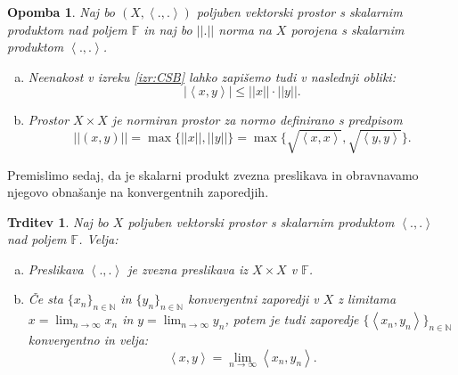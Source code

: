 \documentclass[12pt,a4paper,oneside,fleqn,openany]{book}
\newtheorem{trditev}[izrek]{Trditev}
\newtheorem{opomba}[izrek]{Opomba}
\newcommand{\F}{\mathbb{F}}
\newcommand{\N}{\mathbb{N}}
\newcommand{\abs}[1]{\ensuremath{\lvert #1 \rvert}}
\newcommand{\norm}[1]{\abs{\abs{#1}}}
\newcommand{\Sp}[2]{\ensuremath{\left<#1, #2\right>}}
\begin{document}
\begin{opomba}
	\label{opomb:CSB}
	Naj bo $(X, \Sp{.}{.})$ poljuben vektorski prostor s skalarnim produktom nad poljem $\F$ in naj bo $\norm{.}$ norma na $X$ porojena s skalarnim produktom $\Sp{.}{.}$.
	\begin{enumerate}[a)]
		\item Neenakost v izreku \ref{izr:CSB} lahko zapišemo tudi v naslednji obliki: $$\abs{\Sp{x}{y}} \leq \norm{x}\cdot\norm{y}.$$
		\item Prostor $X\times X$ je normiran prostor za normo definirano s predpisom $$\norm{(x, y)}=\max\{\norm{x}, \norm{y}\}=\max\{\sqrt{\Sp{x}{x}}, \sqrt{\Sp{y}{y}}\}.$$
	\end{enumerate}	
\end{opomba}
Premislimo sedaj, da je skalarni produkt zvezna preslikava in obravnavamo njegovo obnašanje na konvergentnih zaporedjih.
\begin{trditev}
	\label{trd:spzvez}
	Naj bo $X$ poljuben vektorski prostor s skalarnim produktom $\Sp{.}{.}$ nad poljem $\F$. Velja: \begin{enumerate}[a)]
		\item Preslikava $\Sp{.}{.}$ je zvezna preslikava iz $X\times X$ v $\F$.
		\item Če sta $\{x_n\}_{n\in\N}$ in $\{y_n\}_{n\in\N}$ konvergentni zaporedji v $X$ z limitama $x = \lim_{n\to \infty}x_n$ in $y = \lim_{n\to \infty}y_n$, potem je tudi zaporedje $\{\Sp{x_n}{y_n}\}_{n\in\N}$ konvergentno in velja: $$\Sp{x}{y} = \lim_{n\to \infty}\Sp{x_n}{y_n}.$$
	\end{enumerate}
\end{trditev}
\end{document}
